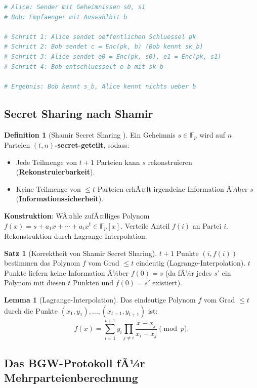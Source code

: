 ﻿\documentclass[a4paper,12pt]{scrreprt}
\theoremstyle{definition}
\newtheorem{definition}{Definition}[section]
\newtheorem{satz}{Satz}[section]
\newtheorem{lemma}{Lemma}[section]
\begin{document}
\begin{lstlisting}[language=Python, caption=OT-Protokoll nach Naor-Pinkas (vereinfacht)]
# Alice: Sender mit Geheimnissen s0, s1
# Bob: Empfaenger mit Auswahlbit b

# Schritt 1: Alice sendet oeffentlichen Schluessel pk
# Schritt 2: Bob sendet c = Enc(pk, b) (Bob kennt sk_b)
# Schritt 3: Alice sendet e0 = Enc(pk, s0), e1 = Enc(pk, s1)
# Schritt 4: Bob entschluesselt e_b mit sk_b

# Ergebnis: Bob kennt s_b, Alice kennt nichts ueber b
\end{lstlisting}

\subsection{Secret Sharing nach Shamir}

\begin{definition}[Shamir Secret Sharing \cite{Sha79}]
Ein Geheimnis $s \in \mathbb{F}_p$ wird auf $n$ Parteien \textbf{$(t,n)$-secret-geteilt}, sodass:
\begin{itemize}
    \item Jede Teilmenge von $t+1$ Parteien kann $s$ rekonstruieren (\textbf{Rekonstruierbarkeit}).
    \item Keine Teilmenge von $\leq t$ Parteien erhÃ¤lt irgendeine Information Ã¼ber $s$ (\textbf{Informations\-sicherheit}).
\end{itemize}
\textbf{Konstruktion}: WÃ¤hle zufÃ¤lliges Polynom $f(x) = s + a_1 x + \cdots + a_t x^t \in \mathbb{F}_p[x]$. Verteile Anteil $f(i)$ an Partei $i$. Rekonstruktion durch Lagrange-Interpolation.
\end{definition}

\begin{satz}[Korrektheit von Shamir Secret Sharing]
$t+1$ Punkte $(i, f(i))$ bestimmen das Polynom $f$ vom Grad $\leq t$ eindeutig (Lagrange-Interpolation). $t$ Punkte liefern keine Information Ã¼ber $f(0) = s$ (da fÃ¼r jedes $s'$ ein Polynom mit diesen $t$ Punkten und $f(0) = s'$ existiert).
\end{satz}

\begin{lemma}[Lagrange-Interpolation]
Das eindeutige Polynom $f$ vom Grad $\leq t$ durch die Punkte $(x_1, y_1),\ldots,(x_{t+1}, y_{t+1})$ ist:
\[
f(x) = \sum_{i=1}^{t+1} y_i \prod_{j \neq i} \frac{x - x_j}{x_i - x_j} \pmod{p}.
\]
\end{lemma}

\subsection{Das BGW-Protokoll fÃ¼r Mehrparteienberechnung}
\end{document}
